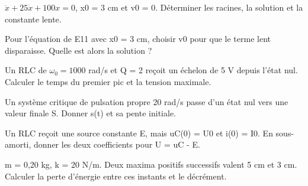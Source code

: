\begin{questions}
\item $\ddot x+25\dot x+100x=0$, x0 = 3 cm et v0 = 0. Déterminer les racines, la solution et la constante lente.
\end{questions}

\begin{questions}
\item Pour l’équation de E11 avec x0 = 3 cm, choisir v0 pour que le terme lent disparaisse. Quelle est alors la solution ?
\end{questions}



\begin{questions}
\item Un RLC de $\omega_0=1000$ rad/s et Q = 2 reçoit un échelon de 5 V depuis l’état nul. Calculer le temps du premier pic et la tension maximale.
\end{questions}

\begin{questions}
\item Un système critique de pulsation propre 20 rad/s passe d’un état nul vers une valeur finale S. Donner s(t) et sa pente initiale.
\end{questions}

\begin{questions}
\item Un RLC reçoit une source constante E, mais uC(0) = U0 et i(0) = I0. En sous-amorti, donner les deux coefficients pour U = uC - E.
\end{questions}



\begin{questions}
\item m = 0,20 kg, k = 20 N/m. Deux maxima positifs successifs valent 5 cm et 3 cm. Calculer la perte d’énergie entre ces instants et le décrément.
\end{questions}

